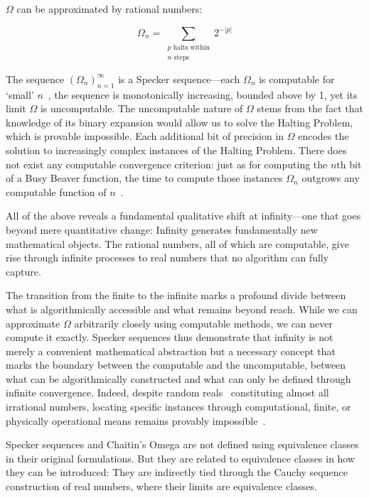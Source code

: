 \documentclass[shortAfour,sageh,times]{sagej}
\begin{document}
$\Omega$ can be approximated by
rational numbers:

$$\Omega_n = \sum_{\substack{p \text{ halts within} \\ n \text{ steps}}} 2^{-|p|}$$

The sequence $(\Omega_n)_{n=1}^{\infty}$ is a Specker sequence---each $\Omega_n$ is computable for `small' $n$~\citep{calude-dinneen06}, the sequence is monotonically increasing, bounded above by 1, yet its limit $\Omega$ is uncomputable.
The uncomputable nature of $\Omega$ stems from the fact that knowledge of its binary expansion would allow us to solve the Halting Problem, which is provable impossible.
Each additional bit of precision in $\Omega$ encodes the solution to increasingly complex instances of the Halting Problem.
There does not exist any computable convergence criterion: just as for computing the $n$th bit of a Busy Beaver function, the time to compute those instances $\Omega_n$ outgrows any computable function of $n$~\citep{chaitin-bb}.


All of the above reveals a fundamental qualitative shift at infinity---one that goes beyond mere quantitative change:
Infinity generates fundamentally new mathematical objects. The rational numbers, all of which are computable, give rise through infinite processes to real numbers that no algorithm can fully capture.

The transition from the finite to the infinite marks a profound divide between what is algorithmically accessible and what remains beyond reach.
While we can approximate \(\Omega\) arbitrarily closely using computable methods, we can never compute it exactly.
Specker sequences thus demonstrate that infinity is not merely a convenient mathematical abstraction but a necessary concept that marks the boundary between the computable and the uncomputable,
between what can be algorithmically constructed and what can only be defined through infinite convergence.
Indeed, despite random reals~\citep{martin-lof} constituting almost all irrational numbers, locating specific instances through computational, finite, or physically operational means remains provably impossible~\citep{calude:02}.

Specker sequences and Chaitin's Omega are not defined using equivalence classes in their original formulations.
But they are related to equivalence classes in how they can be introduced: They are indirectly tied through the Cauchy sequence construction of real numbers, where their limits are equivalence classes.
\end{document}
